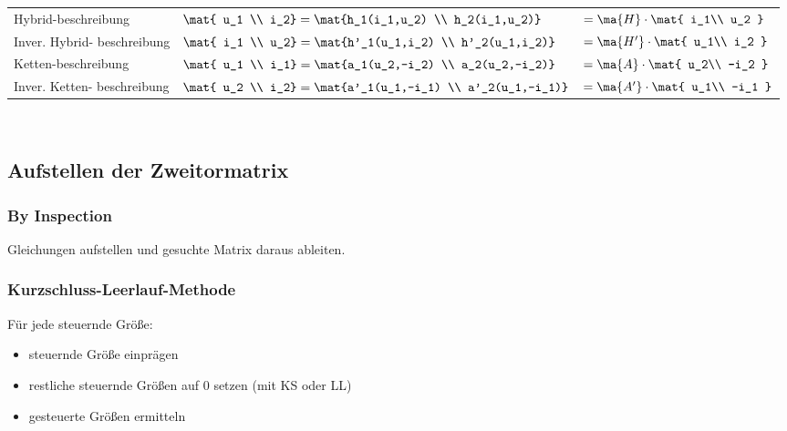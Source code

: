 \documentclass[fs, footer]{latex4ei}
\begin{document}
\begin{multicols*}{4}
\begin{tabular}{@{}p{1.3cm}|ll@{}}
        Hybrid-beschreibung         & $\mat{ u_1                                                                              \\ i_2} = \mat{h_1(i_1,u_2) \\ h_2(i_1,u_2)} $ & $= \ma{H} \cdot \mat{ i_1\\ u_2 }$\\ \mrule
        Inver. Hybrid- beschreibung & $\mat{ i_1                                                                              \\ u_2} = \mat{h'_1(u_1,i_2) \\ h'_2(u_1,i_2)}$ & $= \ma{H'} \cdot \mat{ u_1\\ i_2 }$ \\ \mrule
        Ketten-beschreibung         & $\mat{ u_1                                                                              \\ i_1} = \mat{a_1(u_2,-i_2) \\ a_2(u_2,-i_2)}$ & $= \ma{A} \cdot \mat{ u_2\\ -i_2 }$\\ \mrule
        Inver. Ketten- beschreibung & $\mat{ u_2                                                                              \\ i_2} = \mat{a'_1(u_1,-i_1) \\ a'_2(u_1,-i_1)}$ &  $= \ma{A'} \cdot \mat{ u_1\\ -i_1 }$
    \end{tabular}\\

    \subsection{Aufstellen der Zweitormatrix}
    \subsubsection{By Inspection}
    Gleichungen aufstellen und gesuchte Matrix daraus ableiten.
    \subsubsection{Kurzschluss-Leerlauf-Methode}
    Für jede steuernde Größe:
    \begin{itemize}
        \item steuernde Größe einprägen
        \item restliche steuernde Größen auf 0 setzen (mit KS oder LL)
        \item gesteuerte Größen ermitteln
    \end{itemize}

\end{multicols*}
\end{document}

